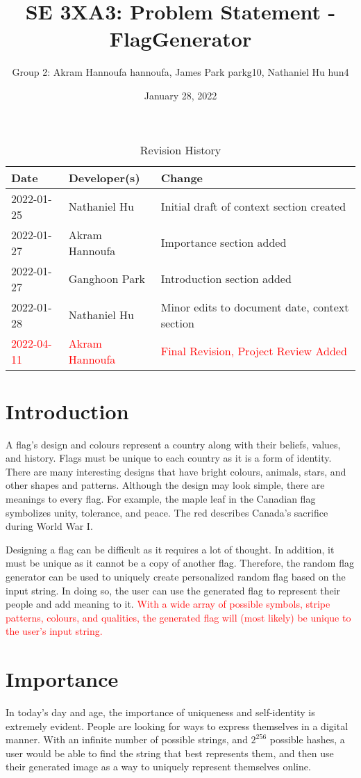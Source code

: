 \documentclass[12pt, letterpaper]{article}
\title{SE 3XA3: Problem Statement - FlagGenerator}
\author{Group 2: Akram Hannoufa \- hannoufa, James Park \- parkg10, Nathaniel Hu \- hun4
}
\date{January 28, 2022}
\begin{document}
\begin{table}[hp]
\caption{Revision History} \label{TblRevisionHistory}
\begin{tabularx}{\textwidth}{llX}
\toprule
\textbf{Date} & \textbf{Developer(s)} & \textbf{Change}\\
\midrule
2022-01-25 & Nathaniel Hu & Initial draft of context section created \\
2022-01-27 & Akram Hannoufa & Importance section added \\
2022-01-27 & Ganghoon Park & Introduction section added \\
2022-01-28 & Nathaniel Hu & Minor edits to document date, context section \\
\textcolor{red}{2022-04-11} & \textcolor{red}{Akram Hannoufa} & \textcolor{red}{Final Revision, Project Review Added}\\
\bottomrule
\end{tabularx}
\end{table}

\newpage
\maketitle

\section{Introduction}
A flag’s design and colours represent a country along with their beliefs, values, and history. Flags must be unique to each country as it is a form of identity. There are many interesting designs that have bright colours, animals, stars, and other shapes and patterns. Although the design may look simple, there are meanings to every flag. For example, the maple leaf in the Canadian flag symbolizes unity, tolerance, and peace. The red describes Canada’s sacrifice during World War I.

Designing a flag can be difficult as it requires a lot of thought. In addition, it must be unique as it cannot be a copy of another flag. Therefore, the random flag generator can be used to uniquely create personalized random flag based on the input string. In doing so, the user can use the generated flag to represent their people and add meaning to it. \textcolor{red}{With a wide array of possible symbols, stripe patterns, colours, and qualities, the generated flag will (most likely) be unique to the user's input string.}


\section{Importance}
In today’s day and age, the importance of uniqueness and self-identity is extremely evident. People are looking for ways to express themselves in a digital manner. With an infinite number of possible strings, and $2^{256}$ possible hashes, a user would be able to find the string that best represents them, and then use their generated image as a way to uniquely represent themselves online.
\end{document}
